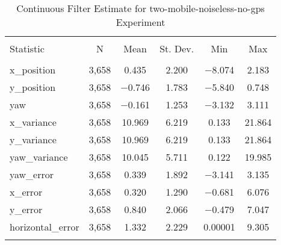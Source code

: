 
\begin{table}[h] \centering 
  \caption{Continuous Filter Estimate for two-mobile-noiseless-no-gps Experiment} 
  \label{tab:two_mobile_noiseless_no_gps_continuous_summary} 
\begin{tabular}{@{\extracolsep{5pt}}lccccc} 
\\[-1.8ex]\hline 
\hline \\[-1.8ex] 
Statistic & \multicolumn{1}{c}{N} & \multicolumn{1}{c}{Mean} & \multicolumn{1}{c}{St. Dev.} & \multicolumn{1}{c}{Min} & \multicolumn{1}{c}{Max} \\ 
\hline \\[-1.8ex] 
x\_position & 3,658 & 0.435 & 2.200 & $-$8.074 & 2.183 \\ 
y\_position & 3,658 & $-$0.746 & 1.783 & $-$5.840 & 0.748 \\ 
yaw & 3,658 & $-$0.161 & 1.253 & $-$3.132 & 3.111 \\ 
x\_variance & 3,658 & 10.969 & 6.219 & 0.133 & 21.864 \\ 
y\_variance & 3,658 & 10.969 & 6.219 & 0.133 & 21.864 \\ 
yaw\_variance & 3,658 & 10.045 & 5.711 & 0.122 & 19.985 \\ 
yaw\_error & 3,658 & 0.339 & 1.892 & $-$3.141 & 3.135 \\ 
x\_error & 3,658 & 0.320 & 1.290 & $-$0.681 & 6.076 \\ 
y\_error & 3,658 & 0.840 & 2.066 & $-$0.479 & 7.047 \\ 
horizontal\_error & 3,658 & 1.332 & 2.229 & 0.00001 & 9.305 \\ 
\hline \\[-1.8ex] 
\end{tabular} 
\end{table} 
